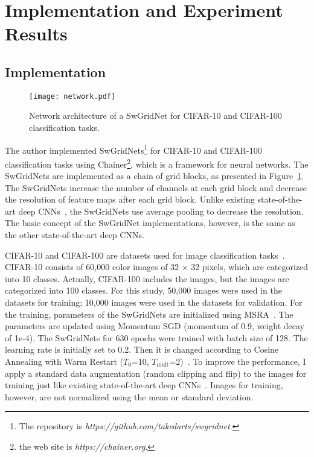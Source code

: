 \documentclass[10pt,twocolumn,letterpaper]{article}
\begin{document}
\section{Implementation and Experiment Results}
\label{sec:evaluation}

\subsection{Implementation}

\begin{figure}
\centering
 \texttt{[image: network.pdf]}
 \caption{Network architecture of a SwGridNet for CIFAR-10 and CIFAR-100 classification tasks.}
 \label{fig:network}
\end{figure}

The author implemented SwGridNets\footnote{The repository is {\it https://github.com/takedarts/swgridnet}.} for CIFAR-10 and CIFAR-100 classification tasks using Chainer\footnote{the web site is {\it https://chainer.org}.}, which is a framework for neural networks.
The SwGridNets are implemented as a chain of grid blocks, as presented in Figure~\ref{fig:network}.
The SwGridNets increase the number of channels at each grid block and
decrease the resolution of feature maps after each grid block.
Unlike existing state-of-the-art deep CNNs~\cite{ResNet,PyramidalResNet,ResNeXt},
the SwGridNets use average pooling to decrease the resolution.
The basic concept of the SwGridNet implementations, however, is the same as the other state-of-the-art deep CNNs.

CIFAR-10 and CIFAR-100 are datasets used for image classification tasks~\cite{CIFAR}.
CIFAR-10 consists of 60,000 color images of 32 $\times$ 32 pixels, which are categorized into 10 classes.
Actually, CIFAR-100 includes the images, but the images are categorized into 100 classes.
For this study, 50,000 images were used in the datasets for training; 10,000 images were used in the datasets for validation.
For the training, parameters of the SwGridNets are initialized using MSRA~\cite{MSRAInit}.
The parameters are updated using Momentum SGD (momentum of 0.9, weight decay of 1e-4).
The SwGridNets for 630 epochs were trained with batch size of 128.
The learning rate is initially set to 0.2. Then it is changed according to Cosine Annealing with Warm Restart ($T_0$=10, $T_{\textrm{mult}}$=2)~\cite{WarmRestart}.
To improve the performance, I apply a standard data augmentation (random clipping and flip) to the images for training just like existing state-of-the-art deep CNNs~\cite{ResNet,PyramidalResNet,ResNeXt}.
Images for training, however, are not normalized using the mean or standard deviation.
\end{document}
